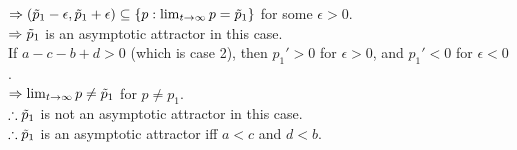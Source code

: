 \begin{pr}[9.8.12]
\begin{enumerate}[(a)]
$\Rightarrow(\tilde p_1-\epsilon, \tilde p_1+\epsilon)\subseteq\{p:\lim_{t\to\infty}p=\tilde p_1\}$ for some $\epsilon>0$.\\
$\Rightarrow\tilde p_1$ is an asymptotic attractor in this case.\\
If $a-c-b+d>0$ (which is case 2), then $p_1'>0$ for $\epsilon>0$, and $p_1'<0$ for $\epsilon<0$.\\
$\Rightarrow\lim_{t\to\infty}p\neq\tilde p_1$ for $p\neq p_1$.\\
$\therefore\tilde p_1$ is not an asymptotic attractor in this case.\\
$\therefore\tilde p_1$ is an asymptotic attractor iff $a<c$ and $d<b$.
\end{enumerate}
\end{pr}
